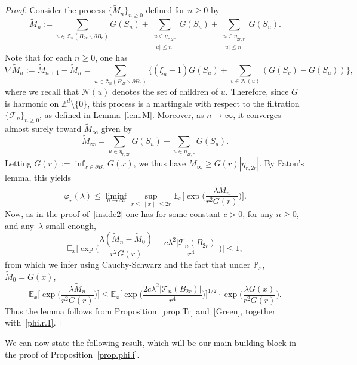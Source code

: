 \documentclass[11pt]{article}
\numberwithin{equation}{section}
\theoremstyle{plain}
\theoremstyle{definition}
\newcommand{\1}{{\text{\Large $\mathfrak 1$}}}
\let\bs\backslash
\begin{document}
\begin{proof}
Consider the process $\{\widetilde M_n\}_{n\ge 0}$
defined for $n\ge 0$ by
\begin{equation*}
\widetilde M_n := \sum_{u\in \mathcal Z_n(B_{2r}\bs \partial B_r)} G(S_u) +
\sum_{\substack{u\in \eta_{r,2r}\\ |u|\le n}}G(S_u)+
\sum_{\substack{u\in \eta_{2r,r}\\ |u|\le n}} G(S_u).
\end{equation*}
Note that for each $n\ge 0$, one has
\[
\nabla \widetilde M_n:= \widetilde M_{n+1}- \widetilde M_n =
\sum_{u\in \mathcal Z_n(B_{2r}\bs \partial B_r)}
\Big\{(\xi_u-1)G(S_u) + \sum_{v\in \mathcal N(u)}(G(S_v) - G(S_u))\Big\},
\]
where we recall that $\mathcal N(u)$ denotes the set of children of $u$.
Therefore, since $G$ is harmonic on $\mathbb Z^d\setminus \{0\}$, this process is a martingale with respect to the filtration
$\{\mathcal F_n\}_{n\ge 0}$, as defined in Lemma~\ref{lem.M}.
Moreover, as $n\to \infty$, it converges almost surely toward $\widetilde M_\infty$ given by
\begin{equation*}
\widetilde M_\infty = \sum_{u\in \eta_{r,2r}} G(S_u) + \sum_{u\in \eta_{2r,r}} G(S_u).
\end{equation*}
Letting $G(r):= \inf_{x\in \partial B_r} G(x)$, we thus have
$\widetilde M_\infty \ge G(r) |\eta_{r,2r}|$.
By Fatou's lemma, this yields
\begin{equation}\label{phi.r.1}
\varphi_r(\lambda) \le \liminf_{n\to \infty}\sup_{r\le \|x\|\le 2r}
\mathbb E_x\Big[\exp\Big(\frac{\lambda \widetilde M_n}{r^2G(r)}\Big)\Big].
\end{equation}
Now, as in the proof of~\eqref{inside2} one has for some constant $c>0$, for any $n\ge 0$, and any~$\lambda$ small enough,
\[
\mathbb E_x\Big[\exp\Big(\frac{\lambda (\widetilde M_n-\widetilde M_0)}
{r^2G(r)} - \frac{c\lambda^2|\mathcal T_n(B_{2r})|}{r^4}\Big)\Big] \le 1,
\]
from which we infer using Cauchy-Schwarz and the fact that under $\mathbb P_x$,
$\widetilde M_0=G(x)$,
\begin{equation*}
\mathbb E_x\Big[\exp\Big(\frac{\lambda \widetilde M_n}{r^2G(r)}\Big)\Big]
\le \mathbb E_x\Big[\exp\Big(\frac{2c\lambda^2
|\mathcal T_n(B_{2r})|}{r^4}\Big)\Big]^{1/2}
\cdot \exp\Big(\frac{\lambda G(x)}{r^2G(r)}\Big).
\end{equation*}
Thus the lemma follows from Proposition~\ref{prop.Tr} and~\eqref{Green}, together with~\eqref{phi.r.1}.
\end{proof}
We can now state the following result,
which will be our main building block in the proof of Proposition~\ref{prop.phi.i}.
\end{document}
